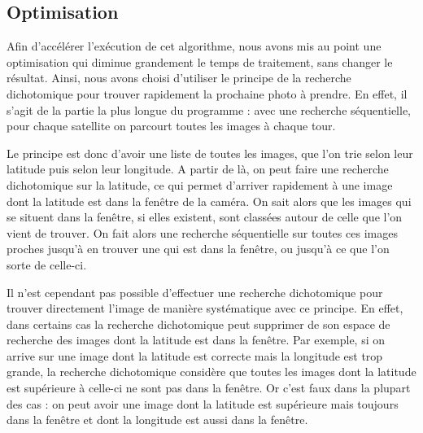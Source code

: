 \documentclass[11pt]{article}
\begin{document}
		\subsection{Optimisation}
		
			Afin d'accélérer l'exécution de cet algorithme, nous avons mis au point une optimisation qui diminue grandement le temps de traitement, sans changer le résultat. Ainsi, nous avons choisi d'utiliser le principe de la recherche dichotomique pour trouver rapidement la prochaine photo à prendre. En effet, il s'agit de la partie la plus longue du programme : avec une recherche séquentielle, pour chaque satellite on parcourt toutes les images à chaque tour.
			
			Le principe est donc d'avoir une liste de toutes les images, que l'on trie selon leur latitude puis selon leur longitude. A partir de là, on peut faire une recherche dichotomique sur la latitude, ce qui permet d'arriver rapidement à une image dont la latitude est dans la fenêtre de la caméra. On sait alors que les images qui se situent dans la fenêtre, si elles existent, sont classées autour de celle que l'on vient de trouver. On fait alors une recherche séquentielle sur toutes ces images proches jusqu'à en trouver une qui est dans la fenêtre, ou jusqu'à ce que l'on sorte de celle-ci.
			
			Il n'est cependant pas possible d'effectuer une recherche dichotomique pour trouver directement l'image de manière systématique avec ce principe. En effet, dans certains cas la recherche dichotomique peut supprimer de son espace de recherche des images dont la latitude est dans la fenêtre. Par exemple, si on arrive sur une image dont la latitude est correcte mais la longitude est trop grande, la recherche dichotomique considère que toutes les images dont la latitude est supérieure à celle-ci ne sont pas dans la fenêtre. Or c'est faux dans la plupart des cas : on peut avoir une image dont la latitude est supérieure mais toujours dans la fenêtre et dont la longitude est aussi dans la fenêtre.
\end{document}
